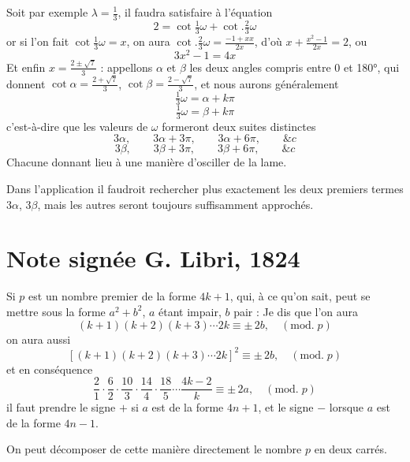\documentclass[11pt,a4paper]{article}
\begin{document}
Soit par exemple $\lambda = \frac{1}{3}$, il faudra satisfaire à l'équation
\[
  2 = \cot \tfrac{1}{3}\omega + \cot. \tfrac{2}{3}\omega
\]
or si l'on fait $\cot\frac{1}{3}\omega = x$, on aura
$\cot.\frac{2}{3}\omega = \frac{-1+xx}{2x}$, d'où
$x + \frac{x^2-1}{2x} = 2$, ou
\[
  3x^2 - 1 = 4x
\]
Et enfin $x = \frac{2 \pm \sqrt{7}}{3}$ : appellons $\alpha$ et $\beta$ les deux
angles compris entre 0 et 180°, qui donnent
$\cot\alpha = \frac{2+\sqrt{7}}{3}$, $\cot\beta = \frac{2-\sqrt{7}}{3}$, et
nous aurons généralement
\[
  \tfrac{1}{3}\omega = \alpha + k\pi
\]
\[
  \tfrac{1}{3}\omega = \beta + k\pi
\]
c'est-à-dire que les valeurs de $\omega$ formeront deux suites distinctes
\[
  3\alpha, \qquad 3\alpha + 3\pi, \qquad 3\alpha + 6\pi, \qquad \&c
\]
\[
  3\beta, \qquad 3\beta + 3\pi, \qquad 3\beta + 6\pi, \qquad \&c
\]
Chacune donnant lieu à une manière d'osciller de la lame.

Dans l'application il faudroit rechercher plus exactement les deux premiers
termes $3\alpha$, $3\beta$, mais les autres seront toujours suffisamment
approchés.

\section{Note signée G. Libri, 1824}


Si $p$ est un nombre premier de la forme $4k+1$, qui, à ce qu'on sait, peut se
mettre sous la forme $a^2 + b^2$, $a$ étant impair, $b$ pair : Je dis que l'on
aura
\[
  (k+1)(k+2)(k+3)\cdots 2k \equiv \pm\,2b, \quad (\mathrm{mod.}\; p)
\]
on aura aussi
\[
  \left[(k+1)(k+2)(k+3)\cdots 2k\right]^{2} \equiv \pm\,2b,
  \quad (\mathrm{mod.}\; p)
\]
et en conséquence
\[
  \frac{2}{1}\cdot\frac{6}{2}\cdot\frac{10}{3}\cdot\frac{14}{4}\cdot
  \frac{18}{5}\cdots\frac{4k-2}{k} \equiv \pm\,2a, \quad (\mathrm{mod.}\; p)
\]
il faut prendre le signe $+$ si $a$ est de la forme $4n+1$, et le signe $-$
lorsque $a$ est de la forme $4n-1$.

On peut décomposer de cette manière directement le nombre $p$ en deux carrés.
\end{document}
